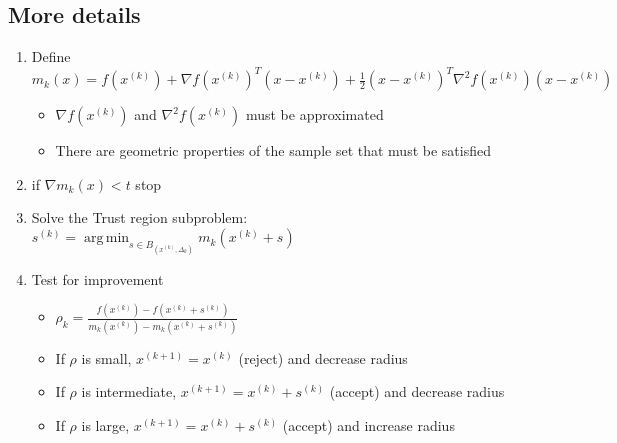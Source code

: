 \documentclass{article} %
\DeclareMathOperator*{\argmin}{arg\,min}
\begin{document}
\subsection{More details}

\begin{enumerate}
	\item Define $m_k(x) = f(x^{(k)}) + \nabla f(x^{(k)})^T (x-x^{(k)}) + \frac 1 2 (x-x^{(k)})^T\nabla^2f(x^{(k)})(x-x^{(k)})$
	\begin{itemize}
		\item $\nabla f(x^{(k)})$ and $\nabla^2 f(x^{(k)})$ must be approximated
		\item There are geometric properties of the sample set that must be satisfied
	\end{itemize}
	\item if $\nabla m_k(x) < t$ stop
	\item Solve the Trust region subproblem: $s^{(k)} = \argmin_{s\in B_(x^{(k)}, \Delta_k)} m_k(x^{(k)} + s)$
	\item Test for improvement
	\begin{itemize}
		\item $\rho_k = \frac{f(x^{(k)}) - f(x^{(k)}+s^{(k)})}{m_k(x^{(k)}) - m_k(x^{(k)}+s^{(k)})}$
		\item If $\rho$ is small, $x^{(k+1)}=x^{(k)}$ (reject) and decrease radius
		\item If $\rho$ is intermediate, $x^{(k+1)}=x^{(k)}+s^{(k)}$ (accept) and decrease radius
		\item If $\rho$ is large, $x^{(k+1)}=x^{(k)}+s^{(k)}$ (accept) and increase radius
	\end{itemize}
\end{enumerate}










\end{document}
